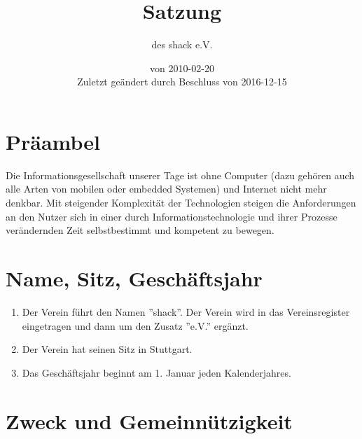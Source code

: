 \documentclass[a4paper, 12pt]{scrartcl}
\title{Satzung}
\subtitle{des shack e.V.}
\author{}
\date{\sffamily von 2010-02-20\\\small Zuletzt geändert durch Beschluss von 2016-12-15}
\begin{document}
\maketitle
\sffamily

\section*{Präambel}
Die Informationsgesellschaft unserer Tage ist ohne Computer (dazu gehören auch alle Arten von mobilen oder embedded Systemen) und Internet nicht mehr denkbar. Mit steigender Komplexität der Technologien steigen die Anforderungen an den Nutzer sich in einer durch Informationstechnologie und ihrer Prozesse verändernden Zeit selbstbestimmt und kompetent zu bewegen.


\section{Name, Sitz, Geschäftsjahr}
     \begin{enumerate}
	  \item Der Verein führt den Namen ”shack”. Der Verein wird in das Vereinsregister eingetragen und dann um den Zusatz ”e.V.” ergänzt.  
	  \item Der Verein hat seinen Sitz in Stuttgart.  
	  \item Das Geschäftsjahr beginnt am 1. Januar jeden Kalenderjahres.
     \end{enumerate}

\section{Zweck und Gemeinnützigkeit}
\end{document}
